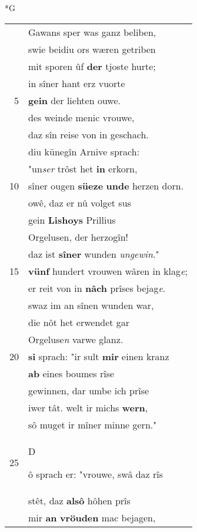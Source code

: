 \documentclass[8pt,a4paper,notitlepage]{article}
\begin{document}
\begin{table}[ht]
\begin{minipage}[t]{0.5\linewidth}
\small
\begin{center}*G
\end{center}
\begin{tabular}{rl}
 & Gawans sper was ganz beliben,\\ 
 & swie beidiu ors wæren getriben\\ 
 & mit sporen ûf \textbf{der} tjoste hurte;\\ 
 & in sîner hant erz vuorte\\ 
5 & \textbf{gein} der liehten ouwe.\\ 
 & des weinde menic vrouwe,\\ 
 & daz sîn reise von in geschach.\\ 
 & diu künegîn Arnive sprach:\\ 
 & "un\textit{ser} trôst het \textbf{in} erkorn,\\ 
10 & sîner ougen \textbf{süeze} \textbf{unde} herzen dorn.\\ 
 & owê, daz er nû volget sus\\ 
 & gein \textbf{Lishoys} Prillius\\ 
 & Orgelusen, der herzogîn!\\ 
 & daz ist \textbf{sîner} wunden \textit{ungewin}."\\ 
15 & \textbf{vünf} hundert vrouwen wâren in klag\textit{e};\\ 
 & er reit von in \textbf{nâch} prîses bejag\textit{e}.\\ 
 & swaz im an sînen wunden war,\\ 
 & die nôt het erwendet gar\\ 
 & Orgeluse\textit{n} varwe glanz.\\ 
20 & \textbf{si} sprach: "ir sult \textbf{mir} einen kranz\\ 
 & \textbf{ab} eines boumes rîse\\ 
 & gewinnen, dar umbe ich prîse\\ 
 & iwer tât. welt ir michs \textbf{wern},\\ 
 & sô muget ir mîner minne gern."\\ 
25 & \begin{large}D\end{large}ô sprach er: "vrouwe, swâ daz rîs\\ 
 & stêt, daz \textbf{alsô} hôhen prîs\\ 
 & mir \textbf{an} \textbf{vröuden} mac bejagen,\\ 

\end{tabular}
\end{minipage}
\end{table}
\end{document}

